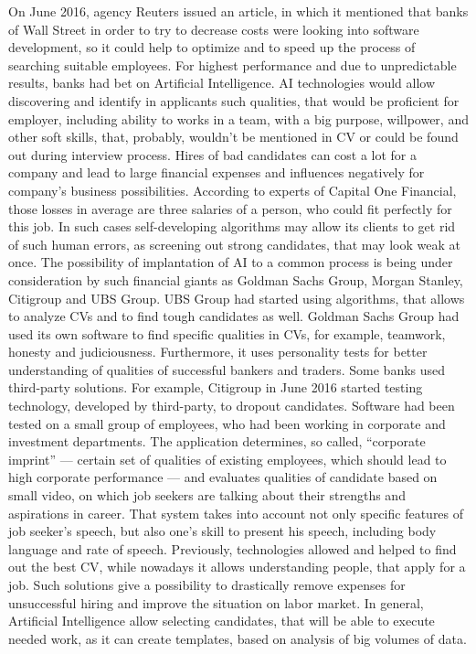 On June 2016, agency Reuters issued an article\cite{reuters_ai_hiring}, in which it mentioned that banks of Wall Street in order to try to decrease costs were looking into software development, so it could help to optimize and to speed up the process of searching suitable employees.
For highest performance and due to unpredictable results, banks had bet on Artificial Intelligence.
AI technologies would allow discovering and identify in applicants such qualities, that would be proficient for employer, including ability to works in a team, with a big purpose, willpower, and other soft skills, that,  probably, wouldn't be mentioned in CV or could be found out during interview process.
Hires of bad candidates can cost a lot for a company and lead to large financial expenses and influences negatively for company's business possibilities.
According to experts of Capital One Financial, those losses in average are three salaries of a person, who could fit perfectly for this job.
In such cases self-developing algorithms may allow its clients to get rid of such human errors, as screening out strong candidates, that may look weak at once.
The possibility of implantation of AI to a common process is being under consideration by such financial giants as Goldman Sachs Group, Morgan Stanley, Citigroup and UBS Group.
UBS Group had started using algorithms, that allows to analyze CVs and to find tough candidates as well.
Goldman Sachs Group had used its own software to find specific qualities in CVs, for example, teamwork, honesty and judiciousness.
Furthermore, it uses personality tests for better understanding of qualities of successful bankers and traders.
Some banks used third-party solutions.
For example, Citigroup in June 2016 started testing technology, developed by third-party, to dropout candidates.
Software had been tested on a small group of employees, who had been working in corporate and investment departments.
The application determines, so called, “corporate imprint” — certain set of qualities of existing employees,
which should lead to high corporate performance — and evaluates qualities of candidate based on 
small video, on which job seekers are talking about their strengths and aspirations in career.
That system takes into account not only specific features of job seeker's speech, but also one's skill to present his speech, including body language and rate of speech.
Previously, technologies allowed and helped to find out the best CV, while nowadays it allows understanding people, that apply for a job.
Such solutions give a possibility to drastically remove expenses for unsuccessful hiring and improve the situation on labor market.
In general, Artificial Intelligence allow selecting candidates, that will be able to execute needed work, as it can create templates, based on analysis of big volumes of data.

